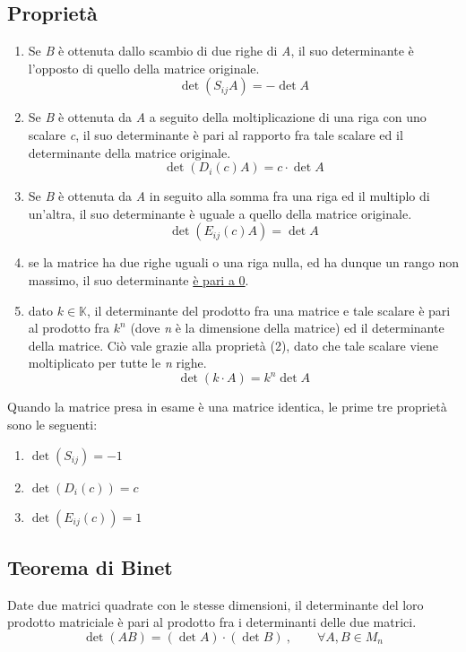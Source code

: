 		\subsection{Proprietà}
			\begin{enumerate}[(1)]
				\item Se \textit{B} è ottenuta dallo scambio di due righe di \textit{A}, il suo determinante è l'opposto di quello della matrice originale.
				$$ \det (S_{ij} A) = - \det A $$
				\item Se \textit{B} è ottenuta da \textit{A} a seguito della moltiplicazione di una riga con uno scalare \textit{c}, il suo determinante è pari al rapporto fra tale scalare ed il determinante della matrice originale.
				$$ \det (D_i (c) A) = c \cdot \det A $$
				\item Se \textit{B} è ottenuta da \textit{A} in seguito alla somma fra una riga ed il multiplo di un'altra, il suo determinante è uguale a quello della matrice originale.
				$$ \det (E_{ij}(c)A) = \det A $$
				\item se la matrice ha due righe uguali o una riga nulla, ed ha dunque un rango non massimo, il suo determinante \underline{è pari a 0}.
				\item dato $k \in \mathbb{K}$, il determinante del prodotto fra una matrice e tale scalare è pari al prodotto fra $k^n$ (dove \textit{n} è la dimensione della matrice) ed il determinante della matrice. Ciò vale grazie alla proprietà (2), dato che tale scalare viene moltiplicato per tutte le \textit{n} righe.
				$$ \det (k \cdot A) = k^n \det A $$
			\end{enumerate}
			
			Quando la matrice presa in esame è una matrice identica, le prime tre proprietà sono le seguenti:
			\begin{enumerate}[(1')]
				\item $\det (S_{ij}) = -1 $
				\item $\det (D_i (c)) = c $
				\item $\det (E_{ij} (c)) = 1 $
			\end{enumerate}
		
		\subsection{Teorema di Binet}
			Date due matrici quadrate con le stesse dimensioni, il determinante del loro prodotto matriciale è pari al prodotto fra i determinanti delle due matrici.
			$$ \det (A B) = (\det A) \cdot (\det B) \: , \qquad \forall A, B \in M_n$$
			
